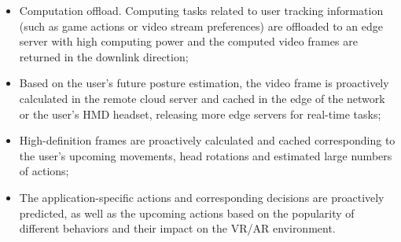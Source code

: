 \documentclass{resume}
\begin{document}
\begin{itemize}
  \item Computation offload. Computing tasks related to user tracking information (such as game actions or video stream preferences) are offloaded to an edge server with high computing power and the computed video frames are returned in the downlink direction;
  \item Based on the user's future posture estimation, the video frame is proactively calculated in the remote cloud server and cached in the edge of the network or the user's HMD headset, releasing more edge servers for real-time tasks;
  \item High-definition frames are proactively calculated and cached corresponding to the user's upcoming movements, head rotations and estimated large numbers of actions;
  \item The application-specific actions and corresponding decisions are proactively predicted, as well as the upcoming actions based on the popularity of different behaviors and their impact on the VR/AR environment.
\end{itemize}



\end{document}
